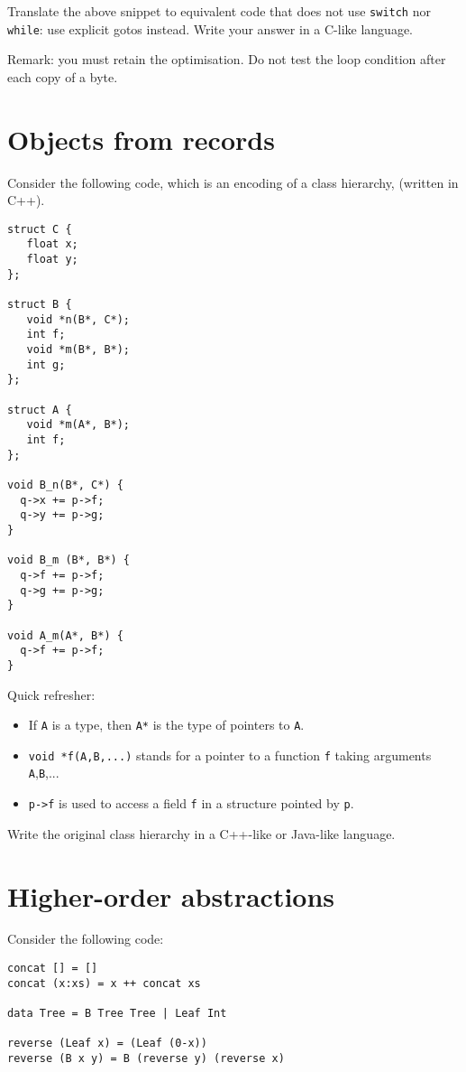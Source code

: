 \documentclass{article}
\begin{document}
Translate the above snippet to equivalent code that does not use
\texttt{switch} nor \texttt{while}: use explicit gotos instead.
Write your answer in a C-like language.

Remark: you must retain the optimisation. Do not test the loop
condition after each copy of a byte.

\newpage
\section{Objects from records}

Consider the following code, which is an encoding of a class
hierarchy, (written in C++).
\begin{verbatim}
struct C {
   float x;
   float y;
};

struct B {
   void *n(B*, C*);
   int f;
   void *m(B*, B*);
   int g;
};

struct A {
   void *m(A*, B*);
   int f;
};

void B_n(B*, C*) {
  q->x += p->f;
  q->y += p->g;
}

void B_m (B*, B*) {
  q->f += p->f;
  q->g += p->g;
}

void A_m(A*, B*) {
  q->f += p->f;
}
\end{verbatim}

Quick refresher:
\begin{itemize}
\item If \texttt{A} is a type, then \texttt{A*} is the type of
  pointers to \texttt{A}.
\item \texttt{void *f(A,B,...)} stands for a pointer to a function
  \texttt{f} taking arguments \texttt{A},\texttt{B},...
\item \texttt{p->f} is used to access a field \texttt{f} in a
  structure pointed by \texttt{p}.
\end{itemize}

Write the original class hierarchy in a C++-like or Java-like language.


\newpage
\section{Higher-order abstractions}

Consider the following code:
\begin{verbatim}
concat [] = []
concat (x:xs) = x ++ concat xs

data Tree = B Tree Tree | Leaf Int

reverse (Leaf x) = (Leaf (0-x))
reverse (B x y) = B (reverse y) (reverse x)
\end{verbatim}
\end{document}
